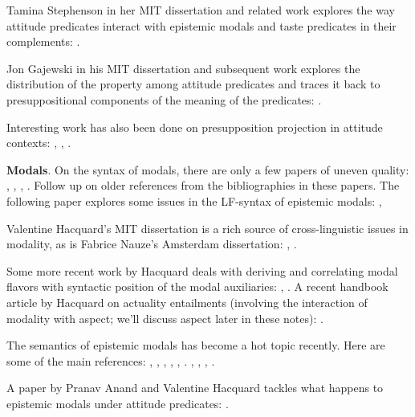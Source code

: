 Tamina Stephenson in her MIT dissertation and related work explores the way
attitude predicates interact with epistemic modals and taste predicates in their
complements: \cite{stephenson-2007-judge-lp,stephenson-2007-thesis}.

Jon Gajewski in his MIT dissertation and subsequent work explores the
distribution of the  property among attitude predicates and
traces it back to presuppositional components of the meaning of the predicates:
\cite{gajewski-2005-thesis,gajewski-2007-neg-raising}.

Interesting work has also been done on presupposition projection in attitude
contexts: \cite{asher-1987-attitudes}, \cite{heim-1992-attitude},
\cite{geurts-1998-attitudes}.

\textbf{Modals}. On the syntax of modals, there are only a few papers of uneven
quality: \cite{bhatt-1997-haveto}, \cite{wurmbrand-1999-raising},
\cite{cormack-smith-2002-modals}, \cite{butler-2003-modality}. Follow up on
older references from the bibliographies in these papers. The following paper
explores some issues in the LF-syntax of epistemic modals:
\cite{fintel-iatridou-2003-ec},

Valentine Hacquard's MIT dissertation is a rich source of
cross-linguistic issues in modality, as is Fabrice Nauze's Amsterdam
dissertation: \cite{hacquard-2006-dissertation},  \cite{nauze-2008-thesis}.

Some more recent work by Hacquard deals with deriving and correlating modal
flavors with syntactic position of the modal auxiliaries:
\cite{hacquard-2010-event-relativity}, \cite{hacquard-2013-modality}. A recent
handbook article by Hacquard on actuality entailments (involving the interaction
of modality with aspect; we'll discuss aspect later in these notes):
\cite{hacquard-2016-actuality}.

The semantics of epistemic modals has become a hot topic recently. Here are some
of the main references: \cite{hacking-1967-possibility},
\cite{teller-1972-epistemic}, \cite{derose-1991-epistemic},
\cite{egan-hawthorne-weatherson-2005-epistemic}, \cite{egan-2007-epistemic},
\cite{macfarlane-2006-might}. \cite{stephenson-2007-judge-lp},
\cite{hawthorne-2007-danger}, \cite{fintel-gillies-2008-cia-leaks},
\cite{fintel-gillies-2008-mmr}.

A paper by Pranav Anand and Valentine Hacquard tackles what happens to epistemic
modals under attitude predicates:
\cite{anand-hacquard-2013-epistemics-attitudes}.

